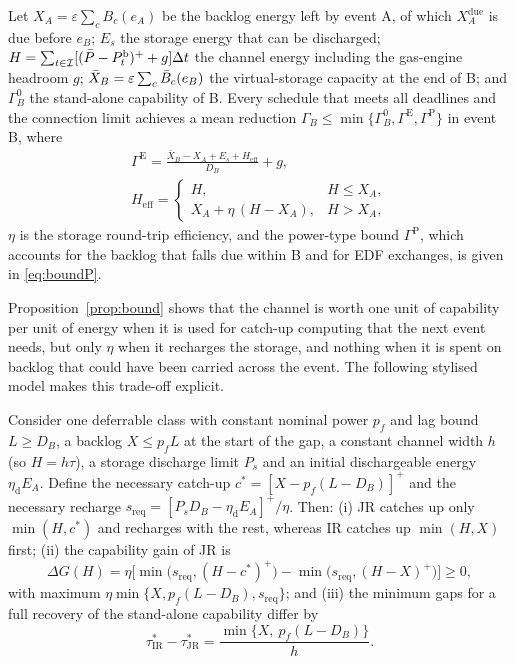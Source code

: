 \begin{proposition}\label{prop:bound}
Let $X_A=\varepsilon\sum_cB_c(e_A)$ be the backlog energy left by event A, of which $X_A^{\mathrm{due}}$ is due before
$e_B$; $E_s$ the storage energy that can be discharged; $H=\sum_{t\in\mathcal{I}}[(\bar P-P^{\mathrm{b}}_t)^++g]\Delta t$ the channel energy
including the gas-engine headroom $g$; $\bar X_B=\varepsilon\sum_c\bar B_c(e_B)$ the virtual-storage capacity at the end
of B; and $\Gamma_B^0$ the stand-alone capability of B. Every schedule that meets all deadlines and the connection
limit achieves a mean reduction $\Gamma_B\le\min\{\Gamma_B^0,\Gamma^{\mathrm{E}},\Gamma^{\mathrm{P}}\}$ in event B, where
\begin{equation}
\begin{gathered}
\Gamma^{\mathrm{E}}=\frac{\bar X_B-X_A+E_s+H_{\mathrm{eff}}}{D_B}+g,\\
H_{\mathrm{eff}}=\begin{cases}H, & H\le X_A,\\ X_A+\eta\,(H-X_A), & H>X_A,\end{cases}
\end{gathered}
\label{eq:bound}
\end{equation}
$\eta$ is the storage round-trip efficiency, and the power-type bound $\Gamma^{\mathrm{P}}$, which accounts for the
backlog that falls due within B and for EDF exchanges, is given in \eqref{eq:boundP}.
\end{proposition}

Proposition~\ref{prop:bound} shows that the channel is worth one unit of capability per unit of energy when it is used
for catch-up computing that the next event needs, but only $\eta$ when it recharges the storage, and nothing when it is
spent on backlog that could have been carried across the event. The following stylised model makes this trade-off
explicit.

\begin{theorem}\label{thm:closed}
Consider one deferrable class with constant nominal power $p_f$ and lag bound $L\ge D_B$, a backlog $X\le p_fL$ at the
start of the gap, a constant channel width $h$ (so $H=h\tau$), a storage discharge limit $P_s$ and an initial
dischargeable energy $\eta_{\mathrm{d}}E_A$. Define the necessary catch-up $c^*=[X-p_f(L-D_B)]^+$ and the necessary
recharge $s_{\mathrm{req}}=[P_sD_B-\eta_{\mathrm{d}}E_A]^+/\eta$. Then:
(i) JR catches up only $\min(H,c^*)$ and recharges with the rest, whereas IR catches up $\min(H,X)$ first;
(ii) the capability gain of JR is
\begin{equation}
\Delta G(H)=\eta\Big[\min\big(s_{\mathrm{req}},(H-c^*)^+\big)-\min\big(s_{\mathrm{req}},(H-X)^+\big)\Big]\ge0,
\label{eq:dG}
\end{equation}
with maximum $\eta\min\{X,p_f(L-D_B),s_{\mathrm{req}}\}$; and (iii) the minimum gaps for a full recovery of the
stand-alone capability differ by
\begin{equation}
\tau^*_{\mathrm{IR}}-\tau^*_{\mathrm{JR}}=\frac{\min\{X,\ p_f(L-D_B)\}}{h}.
\label{eq:tau}
\end{equation}
\end{theorem}

